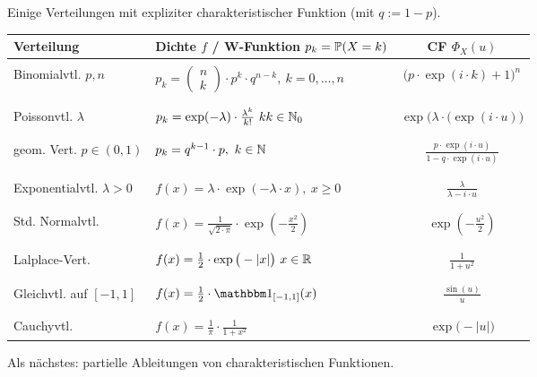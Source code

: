 \begin{beisp}
	Einige Verteilungen mit expliziter charakteristischer Funktion (mit $q:=1-p$).\nl
	\begin{tabular}{l|l|c}
		Verteilung & Dichte $f$ / W-Funktion $p_k=\P(X=k)$ & CF $\Phi_X(u)$\\ \hline\hline
					 &&\\
		Binomialvtl. $p,n$ & $p_k=\begin{pmatrix}
			n\\ k
		\end{pmatrix}\cdot p^k\cdot q^{n-k},~k=0,\ldots, n$ & $\big(p\cdot\exp(i\cdot k)+1\big)^n$\\&&\\ \hline &&\\
		Poissonvtl. $\lambda$ & $p_k=\exp(-\lambda)\cdot\frac{\lambda^k}{k!}~kk\in\N_0$ & $\exp\big(\lambda\cdot(\exp(i\cdot u)\big)$ \\ &&\\ \hline &&\\
		geom. Vert. $p\in(0,1)$ & $p_k=q^{k-1}\cdot p,~k\in\N$ & $\frac{p\cdot\exp(i\cdot u)}{1-q\cdot\exp(i\cdot u)}$ \\ &&\\ \hline &&\\
		Exponentialvtl. $\lambda>0$ & $f(x)=\lambda\cdot\exp(-\lambda\cdot x),~x\geq0$ & $\frac{\lambda}{\lambda-i\cdot u}$\\ &&\\ \hline &&\\
		Std. Normalvtl. & $f(x)=\frac{1}{\sqrt{2\cdot \pi}}\cdot\exp\left(-\frac{x^2}{2}\right)$ & $\exp\left(-\frac{u^2}{2}\right)$\\ &&\\ \hline &&\\
		Lalplace-Vert. & $f(x)=\frac{1}{2}\cdot\exp\big(-|x|\big)~x\in\R$ & $\frac{1}{1+u^2}$\\ &&\\ \hline &&\\
		Gleichvtl. auf $[-1,1]$ & $f(x)=\frac{1}{2}\cdot\indi_{[-1,1]}(x)$ & $\frac{\sin(u)}{u}$\\ &&\\ \hline &&\\
		Cauchyvtl. & $f(x)=\frac{1}{\pi}\cdot\frac{1}{1+x^2}$ & $\exp\big(-|u|\big)$
	\end{tabular}
\end{beisp}

Als nächstes: partielle Ableitungen von charakteristischen Funktionen.

